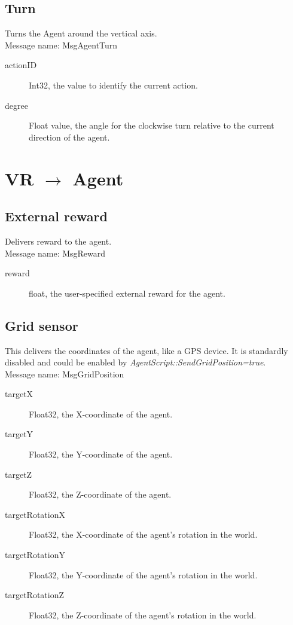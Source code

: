 \documentclass[a4paper,10pt]{scrartcl}
\begin{document}
\subsection{Turn}
Turns the Agent around the vertical axis.\\
Message name: MsgAgentTurn
\begin{description}
 \item [actionID] Int32, the value to identify the current action.
 \item [degree] Float value, the angle for the clockwise turn relative to the current direction of the agent.
\end{description}


\newpage


\section{VR $\rightarrow$ Agent}

\subsection{External reward}
Delivers reward to the agent.\\
Message name: MsgReward
\begin{description}
 \item [reward] float, the user-specified external reward for the agent.
\end{description}

\subsection{Grid sensor}
This delivers the coordinates of the agent, like a GPS device. It is standardly disabled and could be enabled by \emph{AgentScript::SendGridPosition=true}.\\
Message name: MsgGridPosition
\begin{description}
 \item [targetX] Float32, the X-coordinate of the agent.
 \item [targetY] Float32, the Y-coordinate of the agent.
 \item [targetZ] Float32, the Z-coordinate of the agent.
 \item [targetRotationX] Float32, the X-coordinate of the agent's rotation in the world.
 \item [targetRotationY] Float32, the Y-coordinate of the agent's rotation in the world.
 \item [targetRotationZ] Float32, the Z-coordinate of the agent's rotation in the world.
\end{description}
\end{document}
